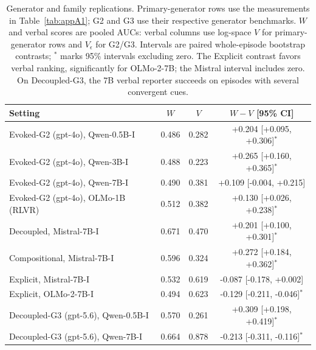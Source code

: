 \begin{table}[h]
\centering
\caption{Generator and family replications. Primary-generator rows use the measurements in Table~\ref{tab:appA1}; G2 and G3 use their respective generator benchmarks. $W$ and verbal scores are pooled AUCs: verbal columns use log-space $V$ for primary-generator rows and $V_\epsilon$ for G2/G3. Intervals are paired whole-episode bootstrap contrasts; $^{*}$ marks 95\% intervals excluding zero. The Explicit contrast favors verbal ranking, significantly for OLMo-2-7B; the Mistral interval includes zero. On Decoupled-G3, the 7B verbal reporter succeeds on episodes with several convergent cues.}
\label{tab:appA10}
\small
\begin{tabular}{lccc}
\toprule
Setting & $W$ & $V$ & $W-V$ [95\% CI] \\
\midrule
Evoked-G2 (gpt-4o), Qwen-0.5B-I & 0.486 & 0.282 & \textcolor{gain}{+0.204} [+0.095, +0.306]$^{*}$ \\
Evoked-G2 (gpt-4o), Qwen-3B-I & 0.488 & 0.223 & \textcolor{gain}{+0.265} [+0.160, +0.365]$^{*}$ \\
Evoked-G2 (gpt-4o), Qwen-7B-I & 0.490 & 0.381 & +0.109 [-0.004, +0.215] \\
Evoked-G2 (gpt-4o), OLMo-1B (RLVR) & 0.512 & 0.382 & \textcolor{gain}{+0.130} [+0.026, +0.238]$^{*}$ \\
Decoupled, Mistral-7B-I & 0.671 & 0.470 & \textcolor{gain}{+0.201} [+0.100, +0.301]$^{*}$ \\
Compositional, Mistral-7B-I & 0.596 & 0.324 & \textcolor{gain}{+0.272} [+0.184, +0.362]$^{*}$ \\
Explicit, Mistral-7B-I & 0.532 & 0.619 & -0.087 [-0.178, +0.002] \\
Explicit, OLMo-2-7B-I & 0.494 & 0.623 & \textcolor{loss}{-0.129} [-0.211, -0.046]$^{*}$ \\
Decoupled-G3 (gpt-5.6), Qwen-0.5B-I & 0.570 & 0.261 & \textcolor{gain}{+0.309} [+0.198, +0.419]$^{*}$ \\
Decoupled-G3 (gpt-5.6), Qwen-7B-I & 0.664 & 0.878 & \textcolor{loss}{-0.213} [-0.311, -0.116]$^{*}$ \\
\bottomrule
\end{tabular}
\end{table}
